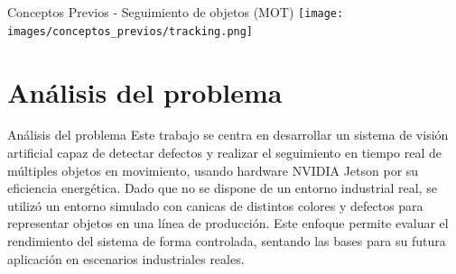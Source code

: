\documentclass[spanish]{beamer}
\begin{document}
\begin{frame}{Conceptos Previos - Seguimiento de objetos (MOT)}
    \texttt{[image: images/conceptos\_previos/tracking.png]}


\end{frame}

\section{Análisis del problema}
\begin{frame}{Análisis del problema}
    Este trabajo se centra en desarrollar un sistema de visión artificial capaz de detectar defectos y realizar el seguimiento en tiempo real de múltiples objetos en movimiento, usando hardware NVIDIA Jetson por su eficiencia energética. Dado que no se dispone de un entorno industrial real, se utilizó un entorno simulado con canicas de distintos colores y defectos para representar objetos en una línea de producción. Este enfoque permite evaluar el rendimiento del sistema de forma controlada, sentando las bases para su futura aplicación en escenarios industriales reales.
\end{frame}
\end{document}
